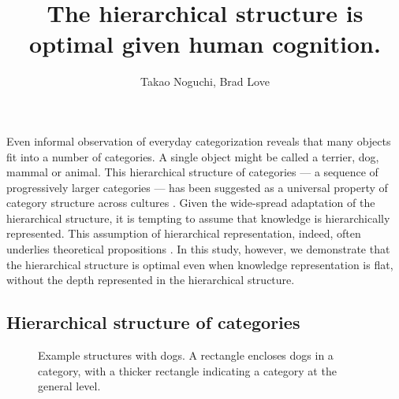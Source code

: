 \documentclass[doc]{apa6}
\title{The hierarchical structure is optimal given human cognition.}
\author{Takao Noguchi, Brad Love}
\affiliation{Department of Experimental Psychology, University College London}
\begin{document}
\maketitle

Even informal observation of everyday categorization reveals that many objects fit into a number of
categories. A single object might be called a terrier, dog, mammal or animal. This hierarchical
structure of categories --- a sequence of progressively larger categories --- has been suggested as
a universal property of category structure across cultures \parencite{Berlin1992a, Atran1998a}.
Given the wide-spread adaptation of the hierarchical structure, it is tempting to assume that
knowledge is hierarchically represented. This assumption of hierarchical representation, indeed,
often underlies theoretical propositions \parencite[e.g.,][]{Tenenbaum2011a}. In this study,
however, we demonstrate that the hierarchical structure is optimal even when knowledge
representation is flat, without the depth represented in the hierarchical structure.


\subsection*{Hierarchical structure of categories}

\begin{figure}
    \centering



    \vspace{10pt}

    \caption{Example structures with dogs. A rectangle encloses dogs in a category, with a thicker
    rectangle indicating a category at the general level.}

\label{fig:example}
\end{figure}
\end{document}
